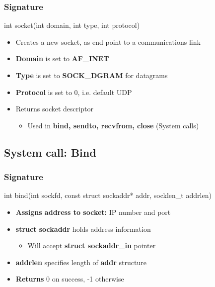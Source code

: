 \documentclass{report}
\begin{document}
    \subsubsection{Signature}
    \bigbreak \noindent 
    \begin{cppcode}
    int socket(int domain, int type, int protocol)
    \end{cppcode}
    \bigbreak \noindent 
    \begin{itemize}
        \item Creates a new socket, as end point to a communications link
        \item \textbf{Domain} is set to \textbf{AF\_INET}
        \item \textbf{Type} is set to \textbf{SOCK\_DGRAM} for datagrams
        \item \textbf{Protocol} is set to 0, i.e. default UDP
        \item Returns socket descriptor 
            \begin{itemize}
                \item Used in \textbf{bind, sendto, recvfrom, close} (System calls)
            \end{itemize}
    \end{itemize}

    \bigbreak \noindent 
    \subsection{System call: Bind}
    \bigbreak \noindent 
    \subsubsection{Signature}
    \bigbreak \noindent 
    \begin{cppcode}
    int bind(int sockfd, const struct sockaddr* addr, socklen_t addrlen)
    \end{cppcode}
    \bigbreak \noindent 
    \begin{itemize}
        \item \textbf{Assigns address to socket:} IP number and port
        \item \textbf{struct sockaddr} holds address information
            \begin{itemize}
                \item Will accept \textbf{struct sockaddr\_in} pointer
            \end{itemize}
        \item \textbf{addrlen} specifies length of \textbf{addr} structure
        \item \textbf{Returns} 0 on success, -1 otherwise
    \end{itemize}
\end{document}
